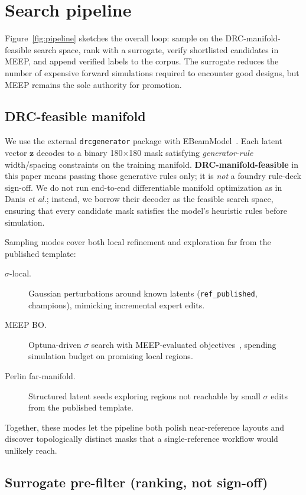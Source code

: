 \documentclass[11pt,a4paper]{article}
\begin{document}
\section{Search pipeline}
\label{sec:pipeline}

Figure~\ref{fig:pipeline} sketches the overall loop: sample on the DRC-manifold-feasible search space, rank with a surrogate, verify shortlisted candidates in MEEP, and append verified labels to the corpus.
The surrogate reduces the number of expensive forward simulations required to encounter good designs, but MEEP remains the sole authority for promotion.

\subsection{DRC-feasible manifold}

We use the external \texttt{drcgenerator} package with EBeamModel~\cite{Danis2026DRCManifold}.
Each latent vector $\mathbf{z}$ decodes to a binary 180$\times$180 mask satisfying \emph{generator-rule} width/spacing constraints on the training manifold.
\textbf{DRC-manifold-feasible} in this paper means passing those generative rules only; it is \emph{not} a foundry rule-deck sign-off.
We do not run end-to-end differentiable manifold optimization as in Danis \emph{et al.}; instead, we borrow their decoder as the feasible search space, ensuring that every candidate mask satisfies the model's heuristic rules before simulation.

Sampling modes cover both local refinement and exploration far from the published template:
\begin{description}
  \item[$\sigma$-local.] Gaussian perturbations around known latents (\texttt{ref\_published}, champions), mimicking incremental expert edits.
  \item[MEEP BO.] Optuna-driven $\sigma$ search with MEEP-evaluated objectives~\cite{Freitas2020BO}, spending simulation budget on promising local regions.
  \item[Perlin far-manifold.] Structured latent seeds exploring regions not reachable by small $\sigma$ edits from the published template.
\end{description}
Together, these modes let the pipeline both polish near-reference layouts and discover topologically distinct masks that a single-reference workflow would unlikely reach.

\subsection{Surrogate pre-filter (ranking, not sign-off)}
\end{document}
